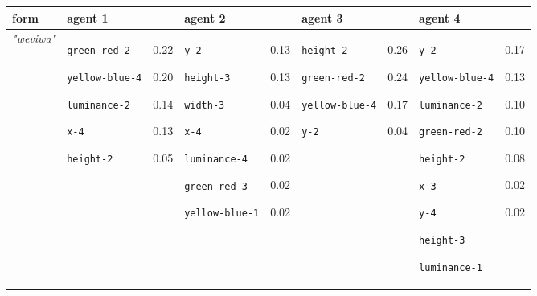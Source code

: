 
{\footnotesize\renewcommand{\arraystretch}{1.5}
\begin{tabular}{@{}p{1.2cm}|p{2.75cm}@{}p{0.8cm}@{}|p{2.75cm}@{}p{0.8cm}@{}|p{2.75cm}@{}p{0.8cm}@{}|p{2.75cm}@{}p{0.8cm}@{}}
form & agent 1 &  & agent 2 &  & agent 3 &  & agent 4 & \\
\hline
\textit{"weviwa"} & \texttt{green-red-2}

\texttt{yellow-blue-4}

\texttt{luminance-2}

\texttt{x-4}

\texttt{height-2} & 0.22

0.20

0.14

0.13

0.05 & \texttt{y-2}

\texttt{height-3}

\texttt{width-3}

\texttt{x-4}

\texttt{luminance-4}

\texttt{green-red-3}

\texttt{yellow-blue-1} & 0.13

0.13

0.04

0.02

0.02

0.02

0.02 & \texttt{height-2}

\texttt{green-red-2}

\texttt{yellow-blue-4}

\texttt{y-2} & 0.26

0.24

0.17

0.04 & \texttt{y-2}

\texttt{yellow-blue-4}

\texttt{luminance-2}

\texttt{green-red-2}

\texttt{height-2}

\texttt{x-3}

\texttt{y-4}

\texttt{height-3}

\texttt{luminance-1} & 0.17

0.13

0.10

0.10

0.08

0.02

0.02


\end{tabular}}
